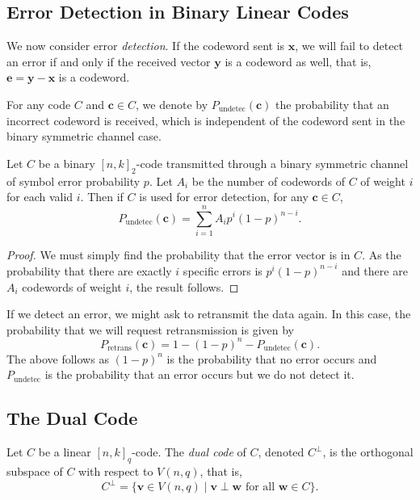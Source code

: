 
\subsection{Error Detection in  Binary Linear Codes}

We now consider error \textit{detection}. If the codeword sent is $\textbf{x}$, we will fail to detect an error if and only if the received vector $\textbf{y}$ is a codeword as well, that is, $\textbf{e}=\textbf{y}-\textbf{x}$ is a codeword.

For any code $C$ and $\textbf{c}\in C$, we denote by $P_\text{undetec}(\textbf{c})$ the probability that an incorrect codeword is received, which is independent of the codeword sent in the binary symmetric channel case.

\begin{theorem}
    Let $C$ be a binary $[n,k]_2$-code transmitted through a binary symmetric channel of symbol error probability $p$. Let $A_i$ be the number of codewords of $C$ of weight $i$ for each valid $i$. Then if $C$ is used for error detection, for any $\textbf{c}\in C$,
    $$P_\text{undetec}(\textbf{c})=\sum_{i=1}^n A_ip^i(1-p)^{n-i}.$$
\end{theorem}
\begin{proof}
    We must simply find the probability that the error vector is in $C$. As the probability that there are exactly $i$ specific errors is $p^i(1-p)^{n-i}$ and there are $A_i$ codewords of weight $i$, the result follows.
\end{proof}

If we detect an error, we might ask to retransmit the data again. In this case, the probability that we will request retransmission is given by
$$P_\text{retrans}(\textbf{c})=1-(1-p)^n-P_\text{undetec}(\textbf{c}).$$
The above follows as $(1-p)^n$ is the probability that no error occurs and $P_\text{undetec}$ is the probability that an error occurs but we do not detect it.

\subsection{The Dual Code}

\begin{definition}
    Let $C$ be a linear $[n,k]_q$-code. The \textit{dual code} of $C$, denoted $C^\perp$, is the orthogonal subspace of $C$ with respect to $V(n,q)$, that is,
    $$C^\perp=\{\textbf{v}\in V(n,q)\mid \textbf{v}\perp\textbf{w}\text{ for all }\textbf{w}\in C\}.$$
\end{definition}

